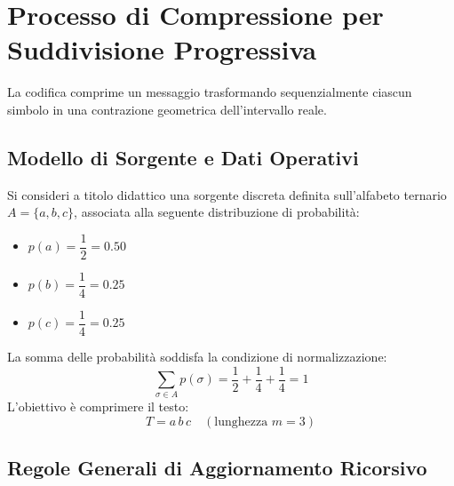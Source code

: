 \FloatBarrier
\section{Processo di Compressione per Suddivisione Progressiva}
\label{sec:processo-compressione-suddivisione}

La codifica comprime un messaggio trasformando sequenzialmente ciascun simbolo in una contrazione geometrica dell'intervallo reale.

\FloatBarrier
\subsection{Modello di Sorgente e Dati Operativi}
\label{subsec:modello-sorgente-esempio}

Si consideri a titolo didattico una sorgente discreta definita sull'alfabeto ternario $A = \{a, b, c\}$, associata alla seguente distribuzione di probabilit\`a:
\begin{itemize}
  \item $p(a) = \dfrac{1}{2} = 0.50$
  \item $p(b) = \dfrac{1}{4} = 0.25$
  \item $p(c) = \dfrac{1}{4} = 0.25$
\end{itemize}
La somma delle probabilit\`a soddisfa la condizione di normalizzazione:
\begin{equation}
  \sum_{\sigma \in A} p(\sigma) = \frac{1}{2} + \frac{1}{4} + \frac{1}{4} = 1
\end{equation}
L'obiettivo \`e comprimere il testo:
\begin{equation}
  T = a\,b\,c \quad (\text{lunghezza } m = 3)
\end{equation}

\FloatBarrier
\subsection{Regole Generali di Aggiornamento Ricorsivo}
\label{subsec:regole-aggiornamento-intervallo}

